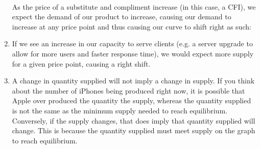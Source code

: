 \documentclass[12pt]{article}
\begin{document}
\begin{enumerate}

\hfill \\
As the price of a substitute and compliment increase (in this case, a CFI), we expect the demand of our product to increase, causing our demand to increase at any price point and thus causing our curve to shift right as such:  


\item
If we see an increase in our capacity to serve clients (e.g. a server upgrade to allow for more users and faster response time), we would expect more supply for a given price point, causing a right shift. 


\item
    A change in quantity supplied will not imply a change in supply. If you think about the number of iPhones being produced right now, it is possible that Apple over produced the quantity the supply, whereas the quantity supplied is not the same as the minimum supply needed to reach equilibrium. Conversely, if the supply changes, that does imply that quantity supplied will change. This is because the quantity supplied must meet supply on the graph to reach equilibrium. 


\end{enumerate}
\end{document}

